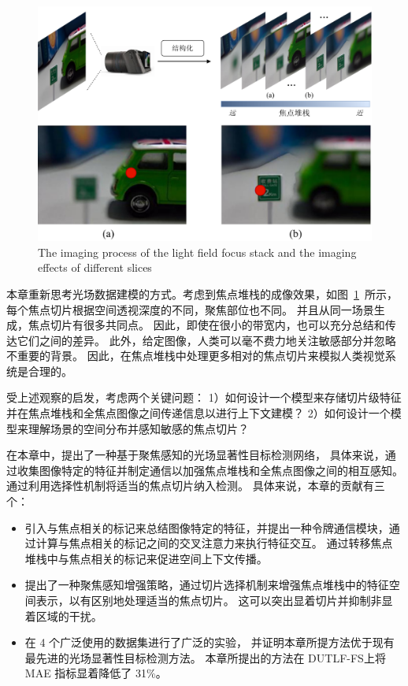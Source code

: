 \begin{figure}[!ht]
	\centering
	\includegraphics[width=0.85\linewidth]{figures/chapter3/cpt3_idea.pdf}
	{The imaging process of the light field focus stack and the imaging effects of different slices}
	\label{figure:cpt3:idea}
\end{figure}




本章重新思考光场数据建模的方式。考虑到焦点堆栈的成像效果，如图~\ref{figure:cpt3:idea}~所示，每个焦点切片根据空间透视深度的不同，聚焦部位也不同。 并且从同一场景生成，焦点切片有很多共同点。
因此，即使在很小的带宽内，也可以充分总结和传达它们之间的差异。 此外，给定图像，人类可以毫不费力地关注敏感部分并忽略不重要的背景。 因此，在焦点堆栈中处理更多相对的焦点切片来模拟人类视觉系统是合理的。 


受上述观察的启发，考虑两个关键问题：
1）如何设计一个模型来存储切片级特征并在焦点堆栈和全焦点图像之间传递信息以进行上下文建模？ 
2）如何设计一个模型来理解场景的空间分布并感知敏感的焦点切片？ 

在本章中，提出了一种基于聚焦感知的光场显著性目标检测网络，
具体来说，通过收集图像特定的特征并制定通信以加强焦点堆栈和全焦点图像之间的相互感知。 
通过利用选择性机制将适当的焦点切片纳入检测。 
具体来说，本章的贡献有三个：



\begin{itemize}
	\item 引入与焦点相关的标记来总结图像特定的特征，并提出一种令牌通信模块，通过计算与焦点相关的标记之间的交叉注意力来执行特征交互。 通过转移焦点堆栈中与焦点相关的标记来促进空间上下文传播。 
	
	\item 提出了一种聚焦感知增强策略，通过切片选择机制来增强焦点堆栈中的特征空间表示，以有区别地处理适当的焦点切片。	这可以突出显着切片并抑制非显着区域的干扰。 
	
	\item 在 4 个广泛使用的数据集进行了广泛的实验，
	并证明本章所提方法优于现有最先进的光场显著性目标检测方法。 本章所提出的方法在 DUTLF-FS上将 MAE 指标显着降低了 31\%。
\end{itemize}







